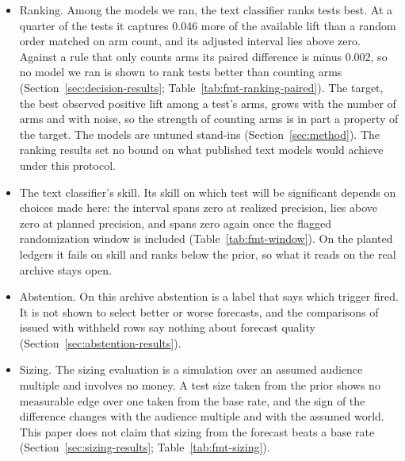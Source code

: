 \begin{itemize}
\item Ranking. Among the models we ran, the text classifier ranks tests best. At a quarter of the tests it captures 0.046 more of the available lift than a random order matched on arm count, and its adjusted interval lies above zero. Against a rule that only counts arms its paired difference is minus 0.002, so no model we ran is shown to rank tests better than counting arms (Section~\ref{sec:decision-results}; Table~\ref{tab:fmt-ranking-paired}). The target, the best observed positive lift among a test's arms, grows with the number of arms and with noise, so the strength of counting arms is in part a property of the target. The models are untuned stand-ins (Section~\ref{sec:method}). The ranking results set no bound on what published text models would achieve under this protocol.
\item The text classifier's skill. Its skill on which test will be significant depends on choices made here: the interval spans zero at realized precision, lies above zero at planned precision, and spans zero again once the flagged randomization window is included (Table~\ref{tab:fmt-window}). On the planted ledgers it fails on skill and ranks below the prior, so what it reads on the real archive stays open.
\item Abstention. On this archive abstention is a label that says which trigger fired. It is not shown to select better or worse forecasts, and the comparisons of issued with withheld rows say nothing about forecast quality (Section~\ref{sec:abstention-results}).
\item Sizing. The sizing evaluation is a simulation over an assumed audience multiple and involves no money. A test size taken from the prior shows no measurable edge over one taken from the base rate, and the sign of the difference changes with the audience multiple and with the assumed world. This paper does not claim that sizing from the forecast beats a base rate (Section~\ref{sec:sizing-results}; Table~\ref{tab:fmt-sizing}).

\end{itemize}
